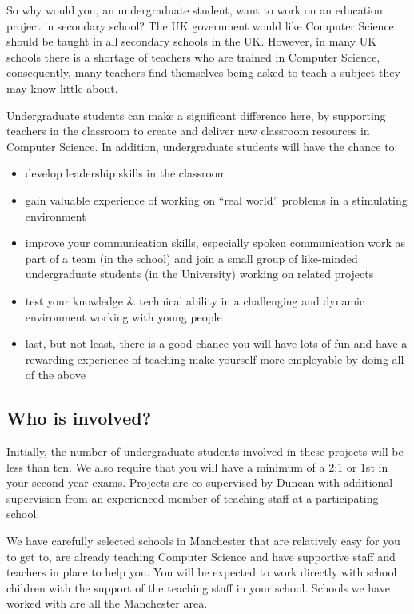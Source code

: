 \documentclass[
  12pt,
]{book}
\providecommand{\tightlist}{%
  \setlength{\itemsep}{0pt}\setlength{\parskip}{0pt}}
\begin{document}
So why would you, an undergraduate student, want to work on an education project in secondary school? The UK government would like Computer Science should be taught in all secondary schools in the UK. \citep{afterthereboot} However, in many UK schools there is a shortage of teachers who are trained in Computer Science, consequently, many teachers find themselves being asked to teach a subject they may know little about. \citep{shutdownrestart}

Undergraduate students can make a significant difference here, by supporting teachers in the classroom to create and deliver new classroom resources in Computer Science. \citep{computinged} In addition, undergraduate students will have the chance to:

\begin{itemize}
\tightlist
\item
  develop leadership skills in the classroom
\item
  gain valuable experience of working on ``real world'' problems in a stimulating environment
\item
  improve your communication skills, especially spoken communication
  work as part of a team (in the school) and join a small group of like-minded undergraduate students (in the University) working on related projects
\item
  test your knowledge \& technical ability in a challenging and dynamic environment working with young people
\item
  last, but not least, there is a good chance you will have lots of fun and have a rewarding experience of teaching
  make yourself more employable by doing all of the above
\end{itemize}

\hypertarget{who-is-involved}{%
\subsection{Who is involved?}\label{who-is-involved}}

Initially, the number of undergraduate students involved in these projects will be less than ten. We also require that you will have a minimum of a 2:1 or 1st in your second year exams. Projects are co-supervised by Duncan with additional supervision from an experienced member of teaching staff at a participating school.

We have carefully selected schools in Manchester that are relatively easy for you to get to, are already teaching Computer Science and have supportive staff and teachers in place to help you. You will be expected to work directly with school children with the support of the teaching staff in your school. Schools we have worked with are all the Manchester area.
\end{document}
